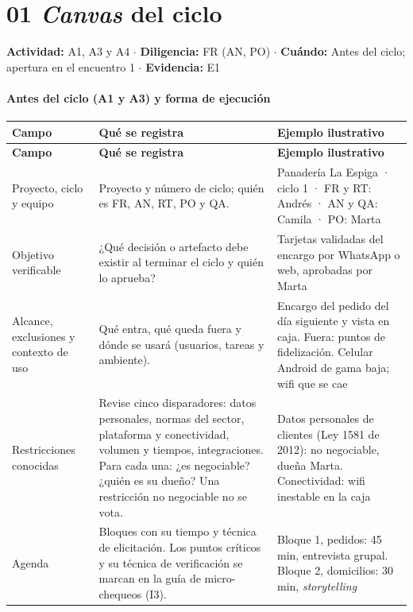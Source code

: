 \documentclass[12pt,letterpaper,oneside]{report}
\begin{document}
\section{01 \textit{Canvas} del ciclo}
\noindent\textbf{Actividad:} A1, A3 y A4 $\cdot$ \textbf{Diligencia:} FR (AN, PO) $\cdot$ \textbf{Cuándo:} Antes del ciclo; apertura en el encuentro 1 $\cdot$ \textbf{Evidencia:} E1


\paragraph{Antes del ciclo (A1 y A3) y forma de ejecución}
{\scriptsize\renewcommand{\arraystretch}{1.25}\setlength{\tabcolsep}{3pt}
\begin{xltabular}{\textwidth}{@{}>{\raggedright\arraybackslash}p{0.25\textwidth}>{\raggedright\arraybackslash}X>{\raggedright\arraybackslash}p{0.30\textwidth}@{}}
\toprule
\textbf{Campo} & \textbf{Qué se registra} & \textbf{Ejemplo ilustrativo} \\
\midrule
\endfirsthead
\toprule
\textbf{Campo} & \textbf{Qué se registra} & \textbf{Ejemplo ilustrativo} \\
\midrule
\endhead
\bottomrule
\endlastfoot
Proyecto, ciclo y equipo & Proyecto y número de ciclo; quién es FR, AN, RT, PO y QA. & Panadería La Espiga · ciclo 1 · FR y RT: Andrés · AN y QA: Camila · PO: Marta \\
Objetivo verificable & ¿Qué decisión o artefacto debe existir al terminar el ciclo y quién lo aprueba? & Tarjetas validadas del encargo por WhatsApp o web, aprobadas por Marta \\
Alcance, exclusiones y contexto de uso & Qué entra, qué queda fuera y dónde se usará (usuarios, tareas y ambiente). & Encargo del pedido del día siguiente y vista en caja. Fuera: puntos de fidelización. Celular Android de gama baja; wifi que se cae \\
Restricciones conocidas & Revise cinco disparadores: datos personales, normas del sector, plataforma y conectividad, volumen y tiempos, integraciones. Para cada una: ¿es negociable? ¿quién es su dueño? Una restricción no negociable no se vota. & Datos personales de clientes (Ley 1581 de 2012): no negociable, dueña Marta. Conectividad: wifi inestable en la caja \\
Agenda & Bloques con su tiempo y técnica de elicitación. Los puntos críticos y su técnica de verificación se marcan en la guía de micro-chequeos (I3). & Bloque 1, pedidos: 45 min, entrevista grupal. Bloque 2, domicilios: 30 min, \textit{storytelling} \\

\end{xltabular}}
\end{document}
